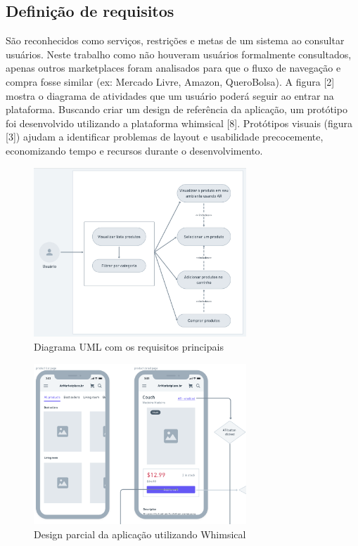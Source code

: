 \documentclass[conference]{IEEEtran}
\begin{document}
\subsection{Definição de requisitos}\label{AA}
São reconhecidos como serviços, restrições e metas de um sistema ao consultar
usuários. Neste trabalho como não houveram usuários formalmente consultados,
apenas outros marketplaces foram analisados para que o fluxo de navegação e
compra fosse similar (ex: Mercado Livre, Amazon, QueroBolsa). A figura [2]
mostra o diagrama de atividades que um usuário poderá seguir ao entrar na
plataforma. Buscando criar um design de referência da aplicação, um protótipo
foi desenvolvido utilizando a plataforma whimsical [8]. Protótipos visuais
(figura [3]) ajudam a identificar problemas de layout e usabilidade
precocemente, economizando tempo e recursos durante o desenvolvimento.

\begin{figure}[h]
  \caption{Diagrama UML com os requisitos principais}

  \centering %
  \includegraphics[width=8cm]{assets/user_uml_diagram.png}
\end{figure}

\begin{figure}[h]
  \caption{Design parcial da aplicação utilizando Whimsical}

  \centering %
  \includegraphics[width=8cm]{assets/design.png}
\end{figure}
\end{document}
